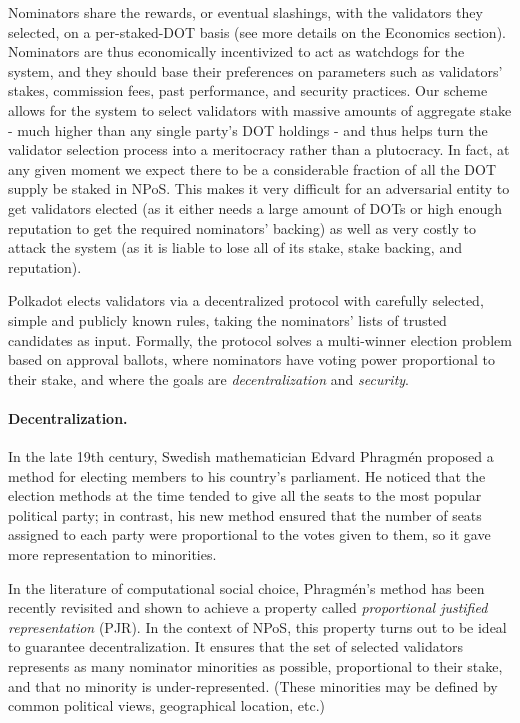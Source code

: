 Nominators share the rewards, or eventual slashings, with the validators they selected, on a per-staked-DOT basis 
(see more details on the Economics section). 
Nominators are thus economically incentivized to act as watchdogs for the system, and they should base their preferences 
on parameters such as validators' stakes, commission fees, past performance, and security practices. 
Our scheme allows for the system to select validators with massive amounts of aggregate stake 
- much higher than any single party's DOT holdings - 
and thus helps turn the validator selection process into a meritocracy rather than a plutocracy.
In fact, at any given moment we expect there to be a considerable fraction of all the DOT supply be staked in NPoS. 
This makes it very difficult for an adversarial entity to get validators elected 
(as it either needs a large amount of DOTs or high enough reputation to get the required nominators' backing)  
as well as very costly to attack the system (as it is liable to lose all of its stake, stake backing, and reputation).

Polkadot elects validators via a decentralized protocol with carefully selected, simple and publicly known rules, 
taking the nominators' lists of trusted candidates as input. Formally, the protocol solves a multi-winner election 
problem based on approval ballots, where nominators have voting power proportional to their stake, 
and where the goals are \emph{decentralization} and \emph{security}.

\paragraph{Decentralization.} In the late 19th century, Swedish mathematician Edvard Phragm\'{e}n 
proposed a method for electing members to his country’s parliament. 
He noticed that the election methods at the time tended to give all the seats 
to the most popular political party; in contrast, his new method ensured that the number of seats 
assigned to each party were proportional to the votes given to them, so it gave more representation to minorities. 

In the literature of computational social choice, Phragm\'{e}n's method has been recently revisited 
and shown to achieve a property called \emph{proportional justified representation} (PJR). 
In the context of NPoS, this property turns out to be ideal to guarantee decentralization. 
It ensures that the set of selected validators represents as many nominator minorities as possible, 
proportional to their stake, and that no minority is under-represented. 
(These minorities may be defined by common political views, geographical location, etc.)

